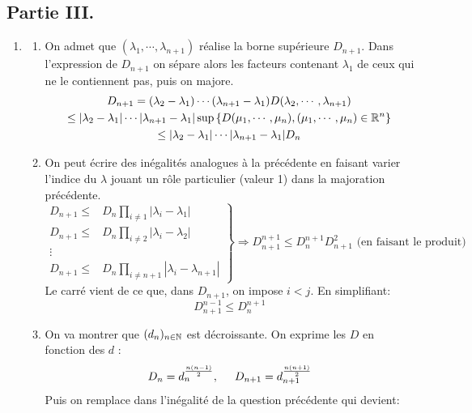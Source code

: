 \subsection*{Partie III.}
\begin{enumerate}
 \item
\begin{enumerate}
 \item On admet que $(\lambda_1,\cdots,\lambda_{n+1})$ réalise la borne supérieure $D_{n+1}$. Dans l'expression de $D_{n+1}$ on sépare alors les facteurs contenant $\lambda_1$ de ceux qui ne le contiennent pas, puis on majore.
\begin{multline*}
 D_{n+1}=(\lambda_2-\lambda_1)\cdots(\lambda_{n+1}-\lambda_1)D(\lambda_2,\cdots,\lambda_{n+1})\\
\leq |\lambda_2-\lambda_1|\cdots |\lambda_{n+1}-\lambda_1| \sup\left\lbrace D(\mu_1,\cdots,\mu_n),(\mu_1,\cdots,\mu_n)\in\mathbb{R}^n\right\rbrace \\
\leq |\lambda_2-\lambda_1|\cdots |\lambda_{n+1}-\lambda_1| D_n
\end{multline*}
\item On peut écrire des inégalités analogues à la précédente en faisant varier l'indice du $\lambda$ jouant un rôle particulier (valeur 1) dans la majoration précédente.
\begin{displaymath}
\left. 
\begin{aligned}
 D_{n+1} \leq& D_n \prod_{i\neq 1}|\lambda_i-\lambda_1| \\
 D_{n+1} \leq& D_n \prod_{i\neq 2}|\lambda_i-\lambda_2| \\
 \vdots& \\
 D_{n+1} \leq& D_n \prod_{i\neq n+1}|\lambda_i-\lambda_{n+1}|  
\end{aligned}
\right\rbrace \Rightarrow
D_{n+1}^{n+1} \leq D_{n}^{n+1}D_{n+1}^{2}  \text{ (en faisant le produit)}
\end{displaymath}
Le carré vient de ce que, dans $D_{n+1}$, on impose $i<j$. En simplifiant:
\begin{displaymath}
 D_{n+1}^{n-1} \leq D_{n}^{n+1}
\end{displaymath}
\item On va montrer que $(d_n)_{n\in\mathbb{N}}$ est décroissante. On exprime les $D$ en fonction des $d$ :
\begin{displaymath}
 D_n=d_n^{\frac{n(n-1)}{2}}, \hspace{0.5cm}
D_{n+1}=d_{n+1}^{\frac{n(n+1)}{2}}
\end{displaymath}
Puis on remplace dans l'inégalité de la question précédente qui devient:

\end{enumerate}
\end{enumerate}
